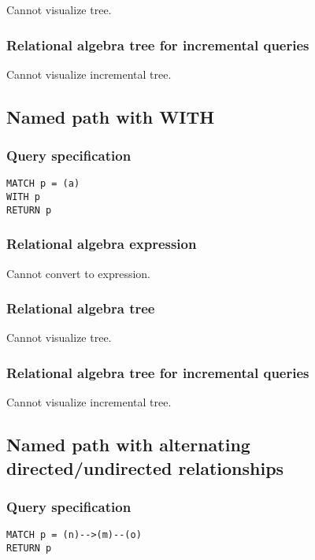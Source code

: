 Cannot visualize tree.

\subsubsection*{Relational algebra tree for incremental queries}

Cannot visualize incremental tree.

\subsection{Named path with WITH}

\subsubsection*{Query specification}

\begin{lstlisting}
MATCH p = (a)
WITH p
RETURN p
\end{lstlisting}

\subsubsection*{Relational algebra expression}

Cannot convert to expression.

\subsubsection*{Relational algebra tree}

Cannot visualize tree.

\subsubsection*{Relational algebra tree for incremental queries}

Cannot visualize incremental tree.

\subsection{Named path with alternating directed/undirected relationships}

\subsubsection*{Query specification}

\begin{lstlisting}
MATCH p = (n)-->(m)--(o)
RETURN p
\end{lstlisting}

